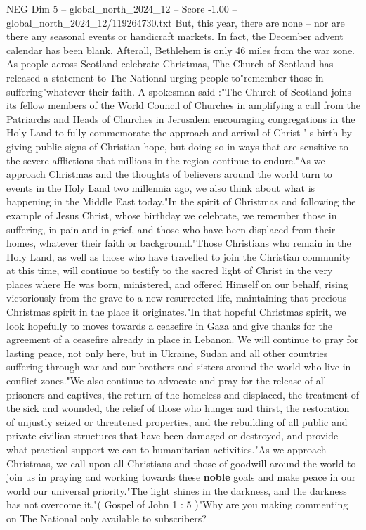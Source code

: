 \begin{textsample}{NEG Dim 5 – global\_north\_2024\_12 – Score -1.00 – global\_north\_2024\_12/119264730.txt}  \label{ex:f5_neg_330}
But, this year, there are none -- nor are there any seasonal events or handicraft markets.
In fact, the December advent calendar has been blank.
Afterall, Bethlehem is only 46 miles from the war zone.
As people across Scotland celebrate Christmas, The Church of Scotland has released a statement to The National urging people to"remember those in suffering"whatever their faith.
A spokesman said :"The Church of Scotland joins its fellow members of the World Council of Churches in amplifying a call from the Patriarchs and Heads of Churches in Jerusalem encouraging congregations in the Holy Land to fully commemorate the approach and arrival of Christ ' s birth by giving public signs of Christian hope, but doing so in ways that are sensitive to the severe afflictions that millions in the region continue to endure."As we approach Christmas and the thoughts of believers around the world turn to events in the Holy Land two millennia ago, we also think about what is happening in the Middle East today."In the spirit of Christmas and following the example of Jesus Christ, whose birthday we celebrate, we remember those in suffering, in pain and in grief, and those who have been displaced from their homes, whatever their faith or background."Those Christians who remain in the Holy Land, as well as those who have travelled to join the Christian community at this time, will continue to testify to the sacred light of Christ in the very places where He was born, ministered, and offered Himself on our behalf, rising victoriously from the grave to a new resurrected life, maintaining that precious Christmas spirit in the place it originates."In that hopeful Christmas spirit, we look hopefully to moves towards a ceasefire in Gaza and give thanks for the agreement of a ceasefire already in place in Lebanon.
We will continue to pray for lasting peace, not only here, but in Ukraine, Sudan and all other countries suffering through war and our brothers and sisters around the world who live in conflict zones."We also continue to advocate and pray for the release of all prisoners and captives, the return of the homeless and displaced, the treatment of the sick and wounded, the relief of those who hunger and thirst, the restoration of unjustly seized or threatened properties, and the rebuilding of all public and private civilian structures that have been damaged or destroyed, and provide what practical support we can to humanitarian activities."As we approach Christmas, we call upon all Christians and those of goodwill around the world to join us in praying and working towards these \textbf{noble} goals and make peace in our world our universal priority."The light shines in the darkness, and the darkness has not overcome it."( Gospel of John 1 : 5 )"Why are you making commenting on The National only available to subscribers?

\end{textsample}
